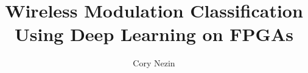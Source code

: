 \documentclass[12pt]{article}
\begin{document}
\title{Wireless Modulation Classification Using Deep Learning on FPGAs}
\author{Cory Nezin}
\maketitle



{}
\end{document}

